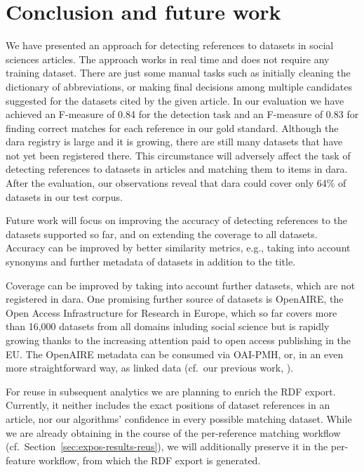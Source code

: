\documentclass{IOS-Book-Article}
\newcommand{\dara}{\textsf{da\textbar ra}}
\begin{document}
\section{Conclusion and future work}
\label{sec:future}
We have presented an approach for detecting references to datasets in social sciences articles.
The approach works in real time and does not require any training dataset.
There are just some manual tasks such as initially cleaning the dictionary of abbreviations, or making final decisions among multiple candidates suggested for the datasets cited by the given article.
In our evaluation we have achieved an F-measure of 0.84 for the detection task and an F-measure of 0.83 for finding correct matches for each reference in our gold standard.  
Although the {\dara} registry is large and it is growing, there are still many datasets that have not yet been registered there. 
This circumstance will adversely affect the task of detecting references to datasets in articles and matching them to items in {\dara}.
After the evaluation, our observations reveal that {\dara} could cover only 64\% of datasets in our test corpus. 

Future work will focus on improving the accuracy of detecting references to the datasets supported so far, and on extending the coverage to all datasets.
Accuracy can be improved by better similarity metrics, e.g., taking into account synonyms and further metadata of datasets in addition to the title.

Coverage can be improved by taking into account further datasets, which are not registered in {\dara}.
One promising further source of datasets is OpenAIRE, the Open Access Infrastructure for Research in Europe, which so far covers more than 16,000 datasets from all domains inluding social science but is rapidly growing thanks to the increasing attention paid to open access publishing in the EU.
The OpenAIRE metadata can be consumed via OAI-PMH, or, in an even more straightforward way, as linked data (cf.\ our previous work, \citet{VahdatiEtAl:MappingResearchMetadata15}).

For reuse in subsequent analytics we are planning to enrich the RDF export.
Currently, it neither includes the exact positions of dataset references in an article, nor our algorithms' confidence in every possible matching dataset.
While we are already obtaining in the course of the per-reference matching workflow (cf.\ Section~\ref{sec:expos-results-reus}), we will additionally preserve it in the per-feature workflow, from which the RDF export is generated.
\end{document}
